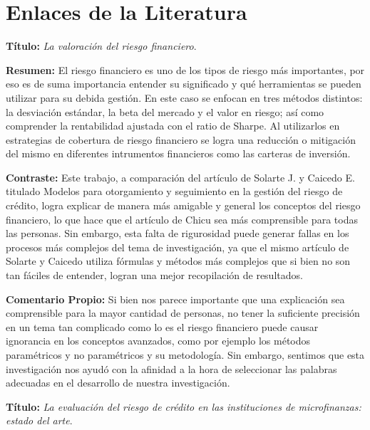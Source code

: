 \documentclass[
  letterpaper,
  DIV=11,
  numbers=noendperiod]{scrreprt}
\begin{document}
\section{Enlaces de la Literatura}\label{enlaces-de-la-literatura}

\textbf{Título:} \emph{La valoración del riesgo financiero}.

\textbf{Resumen:} El riesgo financiero es uno de los tipos de riesgo más
importantes, por eso es de suma importancia entender su significado y
qué herramientas se pueden utilizar para su debida gestión. En este caso
se enfocan en tres métodos distintos: la desviación estándar, la beta
del mercado y el valor en riesgo; así como comprender la rentabilidad
ajustada con el ratio de Sharpe. Al utilizarlos en estrategias de
cobertura de riesgo financiero se logra una reducción o mitigación del
mismo en diferentes intrumentos financieros como las carteras de
inversión.

\textbf{Contraste:} Este trabajo, a comparación del artículo de Solarte
J. y Caicedo E. titulado Modelos para otorgamiento y seguimiento en la
gestión del riesgo de crédito, logra explicar de manera más amigable y
general los conceptos del riesgo financiero, lo que hace que el artículo
de Chicu sea más comprensible para todas las personas. Sin embargo, esta
falta de rigurosidad puede generar fallas en los procesos más complejos
del tema de investigación, ya que el mismo artículo de Solarte y Caicedo
utiliza fórmulas y métodos más complejos que si bien no son tan fáciles
de entender, logran una mejor recopilación de resultados.

\textbf{Comentario Propio:} Si bien nos parece importante que una
explicación sea comprensible para la mayor cantidad de personas, no
tener la suficiente precisión en un tema tan complicado como lo es el
riesgo financiero puede causar ignorancia en los conceptos avanzados,
como por ejemplo los métodos paramétricos y no paramétricos y su
metodología. Sin embargo, sentimos que esta investigación nos ayudó con
la afinidad a la hora de seleccionar las palabras adecuadas en el
desarrollo de nuestra investigación.

\textbf{Título:} \emph{La evaluación del riesgo de crédito en las
instituciones de microfinanzas: estado del arte}.
\end{document}
